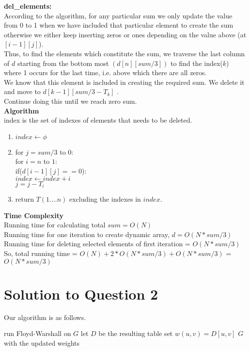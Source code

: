 \documentclass[11pt]{article}
\begin{document}
\textbf{del\_elements:} \\
According to the algorithm, for any particular sum we only update the value from 0 to 1 when we have included that particular element
to create the sum otherwise we either keep inserting zeros or ones depending on the value above (at $[i-1][j]$).\\
Thus, to find the elements which constitute the sum, we traverse the last column of $d$ starting from the bottom most $(d[n][sum/3])$
to find the index($k$) where 1 occurs for the last time, i.e. above which there are all zeros. \\
We know that this element is included in creating the required sum. We delete it and move to $d[k-1][sum/3 - T_k]$ .\\
Continue doing this until we reach zero sum. \\
\textbf{Algorithm} \\
index is the set of indexes of elements that needs to be deleted. \\
\begin{enumerate}
	\item $index \leftarrow \phi$
	\item for $j = sum/3$ to $0$: \\
	\indent for $i = n$ to $1$: \\
	\indent 	if($d[i-1][j] == 0$): \\
	\indent 		$index \leftarrow index + i$ \\
	\indent 		$j = j - T_i$
	\item return $T(1....n)$ excluding the indexes in $index$.
\end{enumerate}

\textbf{Time Complexity} \\
Running time for calculating total $sum = O(N)$ \\
Running time for one iteration to create dynamic array, $d = O(N*sum/3)$ \\
Running time for deleting selected elements of first iteration = $O(N*sum/3)$ \\
So, total running time = $O(N) + 2*O(N*sum/3) + O(N*sum/3)$ = $O(N*sum/3)$

\newpage
\section{Solution to Question 2}

Our algorithm is as follows.

\begin{algorithm}
  \begin{algorithmic}
      \State run Floyd-Warshall on $G$
      \State let $D$ be the resulting table
          \State set $w(u, v) = D[u, v]$
        \EndIf
      \EndFor
      \State \Return $G$ with the updated weights
    \EndFunction
  \end{algorithmic}
\end{algorithm}
\end{document}
